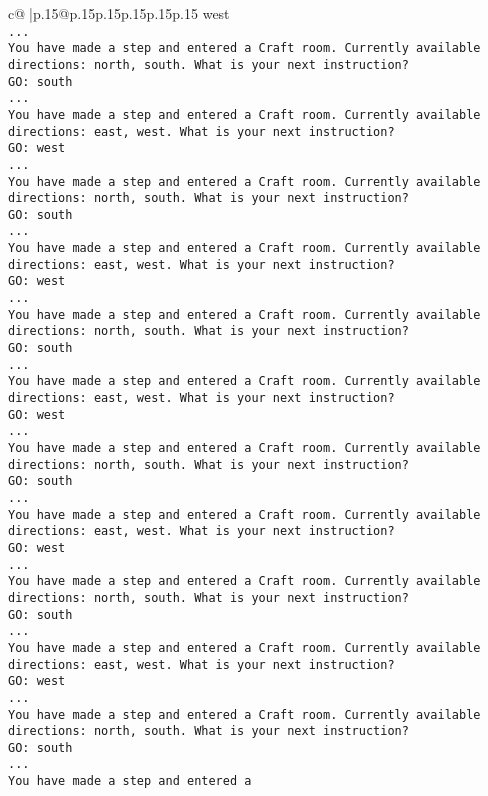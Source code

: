 \documentclass{article}
\begin{document}
{\begin{supertabular}{c@{$\;$}|p{.15\linewidth}@{}p{.15\linewidth}p{.15\linewidth}p{.15\linewidth}p{.15\linewidth}p{.15\linewidth}}
{{{west\\ \tt ...\\ \tt You have made a step and entered a Craft room. Currently available directions: north, south. What is your next instruction?\\ \tt GO: south\\ \tt ...\\ \tt You have made a step and entered a Craft room. Currently available directions: east, west. What is your next instruction?\\ \tt GO: west\\ \tt ...\\ \tt You have made a step and entered a Craft room. Currently available directions: north, south. What is your next instruction?\\ \tt GO: south\\ \tt ...\\ \tt You have made a step and entered a Craft room. Currently available directions: east, west. What is your next instruction?\\ \tt GO: west\\ \tt ...\\ \tt You have made a step and entered a Craft room. Currently available directions: north, south. What is your next instruction?\\ \tt GO: south\\ \tt ...\\ \tt You have made a step and entered a Craft room. Currently available directions: east, west. What is your next instruction?\\ \tt GO: west\\ \tt ...\\ \tt You have made a step and entered a Craft room. Currently available directions: north, south. What is your next instruction?\\ \tt GO: south\\ \tt ...\\ \tt You have made a step and entered a Craft room. Currently available directions: east, west. What is your next instruction?\\ \tt GO: west\\ \tt ...\\ \tt You have made a step and entered a Craft room. Currently available directions: north, south. What is your next instruction?\\ \tt GO: south\\ \tt ...\\ \tt You have made a step and entered a Craft room. Currently available directions: east, west. What is your next instruction?\\ \tt GO: west\\ \tt ...\\ \tt You have made a step and entered a Craft room. Currently available directions: north, south. What is your next instruction?\\ \tt GO: south\\ \tt ...\\ \tt You have made a step and entered a }}}
\end{supertabular}}
\end{document}
